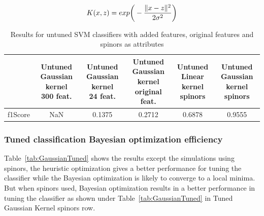 \begin{equation}{\label{eqn:gaussianKernel}}
K (x,z) = exp \bigg(-\frac{\Vert x - z \Vert ^ 2}{2 \sigma^2} \bigg)
\end{equation}


\begin{table}[hbt!]
\caption{\label{tab:GaussianUntuned} Results for untuned SVM classifiers with added features, original features and spinors as attributes}
\centering
\begin{tabular}{lccccc}
\hline
& \makecell{Untuned \\ Gaussian kernel \\ 300 feat.} & \makecell{Untuned \\ Gaussian kernel \\ 24 feat.} & \makecell{Untuned \\ Gaussian kernel \\ original feat.} & \makecell{Untuned \\ Linear kernel \\ spinors}& \makecell{Untuned \\ Gaussian kernel \\ spinors }\\\hline
f1Score& NaN & 0.1375 & 0.2712 & 0.6878 & 0.9555\\
\hline
\end{tabular}
\end{table}

\subsubsection{Tuned classification Bayesian optimization efficiency}

Table~\ref{tab:GaussianTuned} shows the results except the simulations using spinors, the heuristic optimization gives a better performance for tuning the classifier while the Bayesian optimization is likely to converge to a local minima. But when spinors used, Bayesian optimization results in a better performance in tuning the classifier as shown under Table~\ref{tab:GaussianTuned} in Tuned Gaussian Kernel spinors row.  

